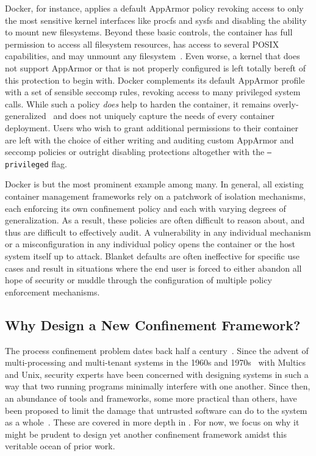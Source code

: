 \documentclass[
  fontsize=12pt,
  titlepage=firstiscover,
  paper=letter,
oneside,
  cleardoublepage=plain,
  parskip=half-,
  DIV=10,
  parindent,
  appendixprefix,
  chapterprefix,
  listof=totoc,
]{scrbook}
\begin{document}
Docker, for instance, applies a default AppArmor policy revoking access to only the most
sensitive kernel interfaces like procfs and sysfs and disabling the ability to mount new
filesystems. Beyond these basic controls, the container has full permission to access all
filesystem resources, has access to several POSIX capabilities, and may unmount any
filesystem~\cite{docker_apparmor, docker_default_apparmor}. Even worse, a kernel that does
not support AppArmor or that is not properly configured is left totally bereft of this
protection to begin with. Docker complements its default AppArmor profile with a set of
sensible seccomp rules, revoking access to many privileged system calls. While such
a policy \textit{does} help to harden the container, it remains
overly-generalized~\cite{sultan2019_container_security} and does not uniquely capture the
needs of every container deployment. Users who wish to grant additional permissions to
their container are left with the choice of either writing and auditing custom AppArmor
and seccomp policies or outright disabling protections altogether with the
\texttt{--privileged} flag.

Docker is but the most prominent example among many. In general, all existing container
management frameworks rely on a patchwork of isolation mechanisms, each enforcing its own
confinement policy and each with varying degrees of generalization. As a result, these
policies are often difficult to reason about, and thus are difficult to effectively audit.
A vulnerability in any individual mechanism or a misconfiguration in any individual policy
opens the container or the host system itself up to attack. Blanket defaults are often
ineffective for specific use cases and result in situations where the end user is forced to
either abandon all hope of security or muddle through the configuration of multiple policy
enforcement mechanisms.

\subsection{Why Design a New Confinement Framework?}\label{ss:why-new}

The process confinement problem dates back half a century~\cite{lampson1973_confinement}.
Since the advent of multi-processing and multi-tenant systems in the 1960s and
1970s~\cite{vyssotsky1965_multics, corbato1965_multics, ritchie1974_unix} with Multics and
Unix, security experts have been concerned with designing systems in such a way that two
running programs minimally interfere with one another. Since then, an abundance of tools
and frameworks, some more practical than others, have been proposed to limit the damage
that untrusted software can do to the system as
a whole~\cite{shu2016_security_isolation_study}. These are covered in more depth in
. For now, we focus on why it might be prudent to design yet another
confinement framework amidst this veritable ocean of prior work.
\end{document}
